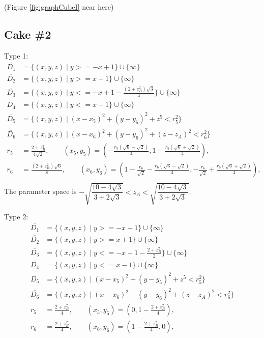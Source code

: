 \documentclass[suppldata, dvipdfmx]{interact}
\theoremstyle{plain}%
\theoremstyle{definition}
\theoremstyle{remark}
\theoremstyle{problemstyle}
\begin{document}
\noindent(Figure \ref{fig:graphCubeI} near here)


\subsection{Cake \#2}
Type 1:
\begin{align*}
\overline{D_1}&= \{ (x,y,z) \mid y >= -x + 1 \} \cup \{ \infty \}\\
\overline{D_2}&= \{ (x,y,z) \mid y >= x + 1 \} \cup \{ \infty \}\\
\overline{D_3}&= \{ (x,y,z) \mid y <= -x + 1 - \frac{(2 + z_B^2)\sqrt{3}}{4} \} \cup \{ \infty \}\\
\overline{D_4}&= \{ (x,y,z) \mid y <= x - 1 \} \cup \{ \infty \}\\
\overline{D_5}&=\{(x,y,z) \mid (x-x_5)^2+(y-y_5)^2+z^5<r_5^2 \} \\
\overline{D_6}&=\{(x,y,z) \mid (x-x_6)^2+(y-y_6)^2+(z-z_A)^2<r_6^2 \} \\
r_5 &= \frac{2 + z_B^2}{4\sqrt{2}}, \qquad
(x_5, y_5) = \left(-\frac{r_5(\sqrt{6} - \sqrt{2})}{4}, 1 - \frac{r_5(\sqrt{6} + \sqrt{2})}{4} \right),\\
r_6 &= \frac{(2 + z_B^2)\sqrt{6}}{8}, \qquad
(x_6, y_6) = \left( 1 - \frac{r_6}{\sqrt{2}} - \frac{r_6(\sqrt{6} - \sqrt{2})}{4}, -\frac{r_6}{\sqrt{2}} + \frac{r_6(\sqrt{6} + \sqrt{2})}{4}\right), \\
\end{align*}
The parameter space is $- \sqrt{\dfrac{10 - 4 \sqrt{3}}{3 + 2 \sqrt{3}}} < z_A <\sqrt{\dfrac{10 - 4 \sqrt{3}}{3 + 2 \sqrt{3}}}$.
\bigskip\par
Type 2:
\begin{align*}
\overline{D_1}&= \{ (x,y,z) \mid y >= -x + 1 \} \cup \{ \infty \}\\
\overline{D_2}&= \{ (x,y,z) \mid y >= x + 1 \} \cup \{ \infty \}\\
\overline{D_3}&= \{ (x,y,z) \mid y <= -x + 1 - \frac{2 + z_B^2}{2} \} \cup \{ \infty \}\\
\overline{D_4}&= \{ (x,y,z) \mid y <= x - 1 \} \cup \{ \infty \}\\
\overline{D_5}&=\{(x,y,z) \mid (x-x_5)^2+(y-y_5)^2+z^5<r_5^2 \} \\
\overline{D_6}&=\{(x,y,z) \mid (x-x_6)^2+(y-y_6)^2+(z-z_A)^2<r_6^2 \} \\
r_5 &= \frac{2 + z_B^2}{4}, \qquad
(x_5, y_5) = \left(0, 1 - \frac{2 + z_B^2}{4} \right), \\
r_6 &= \frac{2 + z_B^2}{4}, \qquad
(x_6, y_6) = \left(1 - \frac{2 + z_B^2}{4}, 0 \right), \\
\end{align*}
\end{document}
